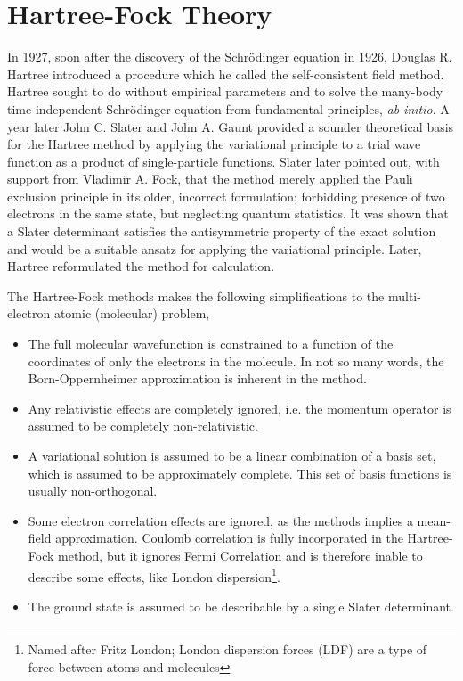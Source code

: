 \chapter{Hartree-Fock Theory} 
    \label{ch:hartree_fock}

    In 1927, soon after the discovery of the Schrödinger equation in 1926, Douglas R.
    Hartree introduced a procedure which he called the self-consistent field 
    method\cite{hartree1928wave}. 
    Hartree sought to do without empirical parameters and
    to solve the many-body time-independent Schrödinger equation from fundamental
    principles, \emph{ab initio}. A year later John C. Slater and John A. Gaunt 
    provided a sounder theoretical basis for the Hartree method by applying the 
    variational principle to a trial wave function as a product of single-particle
    functions\cite{slater1928self}\cite{gaunt1928theory}. 
    Slater later pointed out, with support from Vladimir A. Fock, that the method
    merely applied the Pauli exclusion principle in its older, incorrect formulation;
    forbidding presence of two electrons in the same state, but neglecting 
    quantum statistics\cite{slater1930note}\cite{fock1930naherungsmethode}. It was
    shown that a Slater determinant satisfies the antisymmetric property of the
    exact solution and would be a suitable ansatz for applying the variational
    principle. Later, Hartree reformulated the method for 
    calculation\cite{hartree1935self}.

    The Hartree-Fock methods makes the following simplifications to the multi-electron 
    atomic (molecular) problem,
    \begin{itemize}
        \item The full molecular wavefunction is constrained to a function of the
            coordinates of only the electrons in the molecule. In not so many words,
            the Born-Oppernheimer approximation is inherent in the method.
        \item Any relativistic effects are completely ignored, i.e. the momentum
            operator is assumed to be completely non-relativistic.
        \item A variational solution is assumed to be a linear combination of a basis
            set, which is assumed to be approximately complete. This set of basis
            functions is usually non-orthogonal.
        \item Some electron correlation effects are ignored, as the methods implies
            a mean-field approximation. Coulomb correlation is fully incorporated 
            in the Hartree-Fock method, but it ignores Fermi Correlation and is
            therefore inable to describe some effects, like London 
            dispersion\footnote{Named after Fritz London; London dispersion
            forces (LDF) are a type of force between atoms and 
            molecules\cite{heitler1927wechselwirkung}}.
        \item The ground state is assumed to be describable by a single 
            Slater determinant. 
    \end{itemize}

